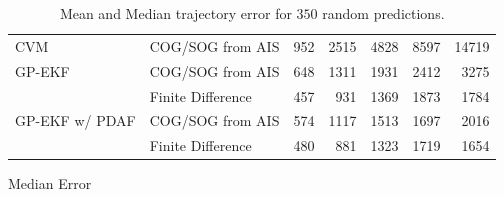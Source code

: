 \begin{table}[h]
\begin{subtable}{\textwidth}
{\begin{tabular}{llrrrrr}
                CVM            & COG/SOG from AIS  & 952 & 2515 & 4828 & 8597 & 14719 \\
                GP-EKF         & COG/SOG from AIS  & 648 & 1311 & 1931 & 2412 & 3275  \\
                               & Finite Difference & 457 & 931  & 1369 & 1873 & 1784  \\
                GP-EKF w/ PDAF & COG/SOG from AIS  & 574 & 1117 & 1513 & 1697 & 2016  \\
                               & Finite Difference & 480 & 881  & 1323 & 1719 & 1654  \\
                \bottomrule
            \end{tabular}
        }
        \caption{Median Error}
    \end{subtable}
    \caption{Mean and Median trajectory error for $350$ random predictions.}
    \label{table:stats_curved_trajectory_error}
\end{table}

